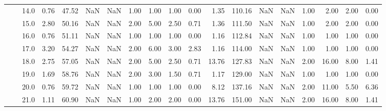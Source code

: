 \begin{tabular}{lllrrrrrrrrrrrrrrrr}
       &     & 14.0 &      0.76 &      47.52 &               NaN &                NaN &  1.00 &   1.00 &             1.00 &                         0.00 &      1.35 &     110.16 &               NaN &                NaN & 1.00 &   2.00 &             2.00 &                         0.00 \\
       &     & 15.0 &      2.80 &      50.16 &               NaN &                NaN &  2.00 &   5.00 &             2.50 &                         0.71 &      1.36 &     111.50 &               NaN &                NaN & 1.00 &   2.00 &             2.00 &                         0.00 \\
       &     & 16.0 &      0.76 &      51.11 &               NaN &                NaN &  1.00 &   1.00 &             1.00 &                         0.00 &      1.16 &     112.84 &               NaN &                NaN & 1.00 &   1.00 &             1.00 &                         0.00 \\
       &     & 17.0 &      3.20 &      54.27 &               NaN &                NaN &  2.00 &   6.00 &             3.00 &                         2.83 &      1.16 &     114.00 &               NaN &                NaN & 1.00 &   1.00 &             1.00 &                         0.00 \\
       &     & 18.0 &      2.75 &      57.05 &               NaN &                NaN &  2.00 &   5.00 &             2.50 &                         0.71 &     13.76 &     127.83 &               NaN &                NaN & 2.00 &  16.00 &             8.00 &                         1.41 \\
       &     & 19.0 &      1.69 &      58.76 &               NaN &                NaN &  2.00 &   3.00 &             1.50 &                         0.71 &      1.17 &     129.00 &               NaN &                NaN & 1.00 &   1.00 &             1.00 &                         0.00 \\
       &     & 20.0 &      0.76 &      59.72 &               NaN &                NaN &  1.00 &   1.00 &             1.00 &                         0.00 &      8.12 &     137.16 &               NaN &                NaN & 2.00 &  11.00 &             5.50 &                         6.36 \\
       &     & 21.0 &      1.11 &      60.90 &               NaN &                NaN &  1.00 &   2.00 &             2.00 &                         0.00 &     13.76 &     151.00 &               NaN &                NaN & 2.00 &  16.00 &             8.00 &                         1.41 \\

\end{tabular}
